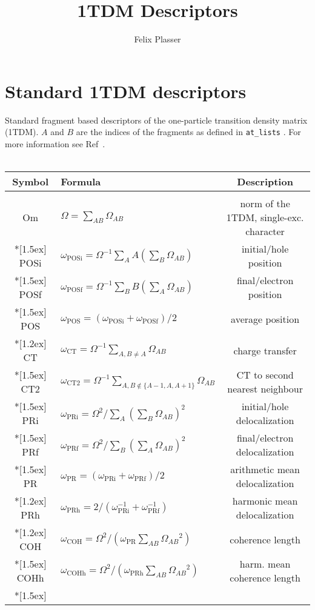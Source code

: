 \documentclass[12pt,a4paper]{article}
\author{Felix Plasser}
\title{1TDM Descriptors}
\newcommand{\om}[1]{\omega_{\textrm{#1}}}
\begin{document}
\section{Standard 1TDM descriptors}
Standard fragment based descriptors of the one-particle transition density matrix (1TDM).
$A$ and $B$ are the indices of the fragments as defined in \texttt{at\_lists} .
For more information see Ref~\cite{DMAT}.
\\~\\
\begin{tabular}{clc}
\hline 
\textbf{Symbol} & \textbf{Formula} & \textbf{Description} \\ 
\hline
\\
Om & $\Omega = \sum_{AB}\Omega_{AB}$ & norm of the 1TDM, single-exc. character \\*[1.5ex]
POSi & $\om{POSi}=\Omega^{-1}\sum_A A\left(\sum_B \Omega_{AB}\right)$ & initial/hole position	 \\*[1.5ex]
POSf & $\om{POSf}=\Omega^{-1}\sum_B B\left(\sum_A \Omega_{AB}\right)$ & final/electron position	 \\*[1.5ex]
POS & $\om{POS}=(\om{POSi} + \om{POSf})/2$ & average position \\*[1.2ex]
CT  & $\om{CT}=\Omega^{-1}\sum_{A,B\neq A}\Omega_{AB}$ & charge transfer \\*[1.5ex]
CT2  & $\om{CT2}=\Omega^{-1}\sum_{A,B\not\in \lbrace A-1,A,A+1\rbrace}\Omega_{AB}$ & CT to second nearest neighbour \\*[1.5ex]
PRi & $\om{PRi}=\Omega^{2}/\sum_A\left(\sum_B \Omega_{AB}\right)^2$ & initial/hole delocalization \\*[1.5ex]
PRf & $\om{PRf}=\Omega^{2}/\sum_B\left(\sum_A \Omega_{AB}\right)^2$ & final/electron delocalization \\*[1.5ex]
PR & $\om{PR}=(\om{PRi}+\om{PRf})/2$ & arithmetic mean delocalization\\*[1.2ex]
PRh & $\om{PRh}=2/(\om{PRi}^{-1}+\om{PRf}^{-1})$ & harmonic mean delocalization\\*[1.2ex]
COH & $\om{COH}=\Omega^{2}/\left(\om{PR}\sum_{AB}\Omega_{AB}{}^2\right)$ & coherence length\\*[1.5ex]
COHh & $\om{COHh}=\Omega^{2}/\left(\om{PRh}\sum_{AB}\Omega_{AB}{}^2\right)$ & harm. mean coherence length\\*[1.5ex]
\hline 
\end{tabular} 
\end{document}
